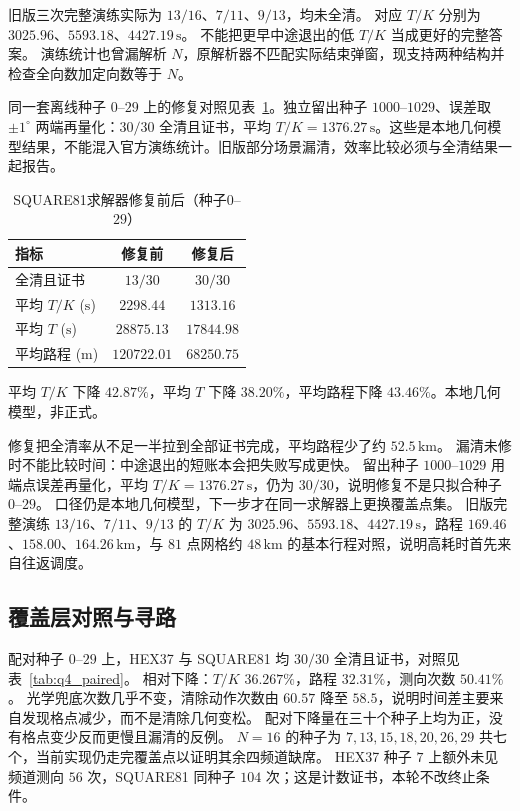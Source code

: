 旧版三次完整演练实际为 $13/16$、$7/11$、$9/13$，均未全清。
对应 $T/K$ 分别为 $3025.96$、$5593.18$、$4427.19\,\mathrm{s}$。
不能把更早中途退出的低 $T/K$ 当成更好的完整答案。
演练统计也曾漏解析 $N$，原解析器不匹配实际结束弹窗，现支持两种结构并检查全向数加定向数等于 $N$。

同一套离线种子 $0$--$29$ 上的修复对照见表~\ref{tab:q4_repair}。独立留出种子 $1000$--$1029$、误差取 $\pm 1^\circ$ 两端再量化：$30/30$ 全清且证书，平均 $T/K=1376.27\,\mathrm{s}$。这些是本地几何模型结果，不能混入官方演练统计。旧版部分场景漏清，效率比较必须与全清结果一起报告。

\begin{table}[H]
\centering
\caption{SQUARE81求解器修复前后（种子$0$--$29$）}
\label{tab:q4_repair}
\begin{tabular}{lcc}
\hline
指标 & 修复前 & 修复后 \\
\hline
全清且证书 & $13/30$ & $30/30$ \\
平均 $T/K$ ($\mathrm{s}$) & $2298.44$ & $1313.16$ \\
平均 $T$ ($\mathrm{s}$) & $28875.13$ & $17844.98$ \\
平均路程 ($\mathrm{m}$) & $120722.01$ & $68250.75$ \\
\hline
\end{tabular}

\vspace{0.4em}
{\small 平均 $T/K$ 下降 $42.87\%$，平均 $T$ 下降 $38.20\%$，平均路程下降 $43.46\%$。本地几何模型，非正式。}
\end{table}

修复把全清率从不足一半拉到全部证书完成，平均路程少了约 $52.5\,\mathrm{km}$。
漏清未修时不能比较时间：中途退出的短账本会把失败写成更快。
留出种子 $1000$--$1029$ 用端点误差再量化，平均 $T/K=1376.27\,\mathrm{s}$，仍为 $30/30$，说明修复不是只拟合种子 $0$--$29$。
口径仍是本地几何模型，下一步才在同一求解器上更换覆盖点集。
旧版完整演练 $13/16$、$7/11$、$9/13$ 的 $T/K$ 为 $3025.96$、$5593.18$、$4427.19\,\mathrm{s}$，路程 $169.46$、$158.00$、$164.26\,\mathrm{km}$，与 $81$ 点网格约 $48\,\mathrm{km}$ 的基本行程对照，说明高耗时首先来自往返调度。

\subsection{覆盖层对照与寻路}

配对种子 $0$--$29$ 上，HEX37 与 SQUARE81 均 $30/30$ 全清且证书，对照见表~\ref{tab:q4_paired}。
相对下降：$T/K$ $36.267\%$，路程 $32.31\%$，测向次数 $50.41\%$。
光学兜底次数几乎不变，清除动作次数由 $60.57$ 降至 $58.5$，说明时间差主要来自发现格点减少，而不是清除几何变松。
配对下降量在三十个种子上均为正，没有格点变少反而更慢且漏清的反例。
$N=16$ 的种子为 $7,13,15,18,20,26,29$ 共七个，当前实现仍走完覆盖点以证明其余四频道缺席。
HEX37 种子 $7$ 上额外未见频道测向 $56$ 次，SQUARE81 同种子 $104$ 次；这是计数证书，本轮不改终止条件。

